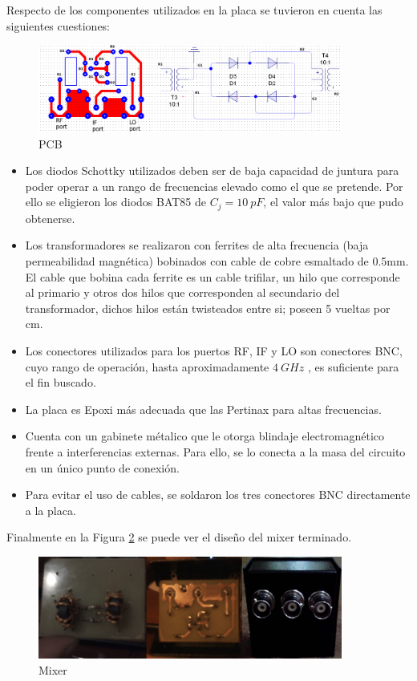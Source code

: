 \documentclass[a4paper,10pt]{article}
\begin{document}
	\indent Respecto de los componentes utilizados en la placa se tuvieron en 
	cuenta las siguientes cuestiones:
	
	\begin{figure}[!htb]
		\centering
		\includegraphics[width=10cm]{Images/PCB.png}
		\caption{PCB}
		\label{pcb}
	\end{figure}

	\begin{itemize}
		\item Los diodos Schottky utilizados deben ser de baja capacidad de 
		juntura para poder operar a un rango de frecuencias elevado como el que 
		se pretende. Por ello se eligieron los diodos BAT85 de $C_j=10~pF$, el 
		valor m\'as bajo que pudo obtenerse. 
		\item Los transformadores se realizaron con ferrites de alta frecuencia 
		(baja permeabilidad magnética) bobinados con cable de cobre esmaltado de
		0.5mm. El cable que bobina cada ferrite es un cable trifilar, un hilo 
		que corresponde al primario y otros dos hilos que corresponden al 
		secundario del transformador, dichos hilos están twisteados entre si; 
		poseen 5 vueltas por cm. 
		\item Los conectores utilizados para los puertos RF, IF y LO son 
		conectores BNC, cuyo rango de operaci\'on, hasta aproximadamente $4~GHz$
		, es suficiente para el fin buscado.
		\item La placa es Epoxi m\'as adecuada que las Pertinax para altas 
		frecuencias.
		\item Cuenta con un gabinete m\'etalico que le otorga blindaje 
		electromagn\'etico frente a interferencias externas. Para ello, se lo 
		conecta a la masa del circuito en un único punto de conexión.
		\item Para evitar el uso de cables, se soldaron los tres conectores BNC
		directamente a la placa.
	\end{itemize}
	 
	\indent Finalmente en la Figura \ref{ecuadorputa} se puede ver el dise\~no 
	del mixer terminado. 
	
	\begin{figure}[!htb]
		\centering
		\includegraphics[width=10cm]{Images/disenioPlaca.png}
		\caption{Mixer}
		\label{ecuadorputa}
	\end{figure}
	
\end{document}
